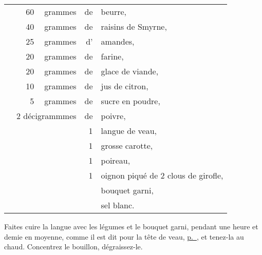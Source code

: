 \footnotesize
\begin{longtable}{rrrrrp{18em}}
  & \hspace{2em}  & 60 & grammes & de & beurre,                                                           \\
  &    & 40 & grammes & de & raisins de Smyrne,                                                           \\
  &    & 25 & grammes & d' & amandes,                                                                     \\
  &    & 20 & grammes & de & farine,                                                                      \\
  &    & 20 & grammes & de & glace de viande,                                                             \\
  &    & 10 & grammes & de & jus de citron,                                                               \\
  &    &  5 & grammes & de & sucre en poudre,                                                             \\
  & \multicolumn{3}{r}{2 décigrammmes} & de & poivre,                                                     \\
  &    &    &         & 1 & langue de veau,                                                               \\
  &    &    &         & 1 & grosse carotte,                                                               \\
  &    &    &         & 1 & poireau,                                                                      \\
  &    &    &         & 1 & oignon piqué de 2 clous de girofle,                                           \\
  &    &    &         &   & bouquet garni,                                                                \\
  &    &    &         &   & sel blanc.                                                                    \\
\end{longtable}
\normalsize

Faites cuire la langue avec les légumes et le bouquet garni, pendant une heure
et demie en moyenne, comme il est dit pour la tête de veau,
\hyperlink{p0416}{p. \pageref{pg0416}}, et tenez-la au chaud. Concentrez le
bouillon, dégraissez-le.

